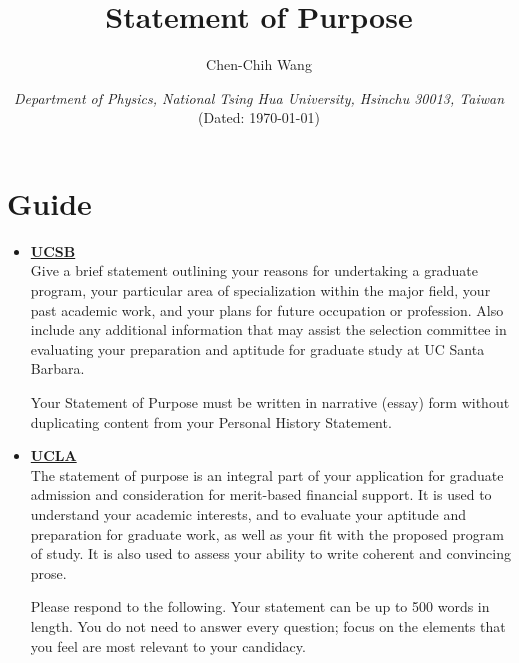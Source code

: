 \documentclass[12font]{article}
\title{\textbf{Statement of Purpose}}
\author{Chen-Chih Wang  }
\date{\textit{Department of Physics, National Tsing Hua University, Hsinchu 30013, Taiwan} \\ (Dated: \today)}
\numberwithin{equation}{section}    %
\begin{document}
\maketitle
\renewcommand\qedsymbol{$\blacksquare$}



\fontsize{12pt}{16pt}\selectfont

\section*{Guide}
{\color{violet}
\begin{itemize}
    \item \textbf{\underline{UCSB}} \\
        Give a brief statement outlining your reasons for undertaking a graduate program, your particular area of specialization within the major field, your past academic work, and your plans for future occupation or profession. Also include any additional information that may assist the selection committee in evaluating your preparation and aptitude for graduate study at UC Santa Barbara.

        Your Statement of Purpose must be written in narrative (essay) form without duplicating content from your Personal History Statement.

    \item \textbf{\underline{UCLA}} \\
        The statement of purpose is an integral part of your application for graduate admission and consideration for merit-based financial support. It is used to understand your academic interests, and to evaluate your aptitude and preparation for graduate work, as well as your fit with the proposed program of study. It is also used to assess your ability to write coherent and convincing prose.

        Please respond to the following. Your statement can be up to 500 words in length. You do not need to answer every question; focus on the elements that you feel are most relevant to your candidacy.


\end{itemize}}
\end{document}
